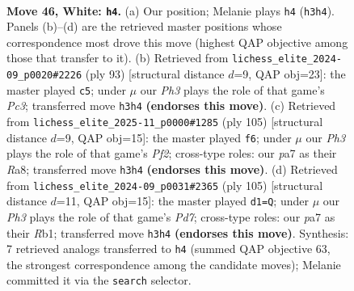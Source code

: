 \documentclass[11pt]{article}
\begin{document}
\clearpage

\begin{figure}[p]\centering
\begin{subfigure}{0.46\textwidth}\centering
\resizebox{\linewidth}{!}{%
\newchessgame
\chessboard[
  setfen={8/p2p4/2p4k/4K3/8/3r3P/5P2/8 w - - 3 46},
  showmover=false,
  pgfstyle=straightmove, color=movearrow, markmove={h3-h4}
]}
\caption{}
\end{subfigure}\hfill
\begin{subfigure}{0.46\textwidth}\centering
\resizebox{\linewidth}{!}{%
\newchessgame
\chessboard[
  setfen={8/4k3/2p4R/p4R2/8/2P5/6PP/4K3 b - - 0 47},
  showmover=false,
  pgfstyle=straightmove, color=movearrow, markmove={c6-c5}
]}
\caption{}
\end{subfigure}
\\[4pt]
\begin{subfigure}{0.46\textwidth}\centering
\resizebox{\linewidth}{!}{%
\newchessgame
\chessboard[
  setfen={r7/2R2p2/8/8/3p4/1k5P/6P1/6K1 b - - 0 53},
  showmover=false,
  pgfstyle=straightmove, color=movearrow, markmove={f7-f6}
]}
\caption{}
\end{subfigure}\hfill
\begin{subfigure}{0.46\textwidth}\centering
\resizebox{\linewidth}{!}{%
\newchessgame
\chessboard[
  setfen={8/3R4/2P5/6p1/4k3/7P/3p2K1/1r6 b - - 0 53},
  showmover=false,
  pgfstyle=straightmove, color=movearrow, markmove={d2-d1}
]}
\caption{}
\end{subfigure}
\caption{\textbf{Move 46, White: \texttt{h4}.} (a) Our position; Melanie plays \texttt{h4} (\texttt{h3h4}). Panels (b)--(d) are the retrieved master positions whose correspondence most drove this move (highest QAP objective among those that transfer to it). (b) Retrieved from \texttt{lichess\_elite\_2024-09\_p0020\#2226} (ply 93) [structural distance $d$=9, QAP obj=23]: the master played \texttt{c5}; under $\mu$ our \emph{Ph3} plays the role of that game's \emph{Pc3}; transferred move \texttt{h3h4} \textbf{(endorses this move)}. (c) Retrieved from \texttt{lichess\_elite\_2025-11\_p0000\#1285} (ply 105) [structural distance $d$=9, QAP obj=15]: the master played \texttt{f6}; under $\mu$ our \emph{Ph3} plays the role of that game's \emph{Pf2}; cross-type roles: our \emph{p}a7 as their \emph{R}a8; transferred move \texttt{h3h4} \textbf{(endorses this move)}. (d) Retrieved from \texttt{lichess\_elite\_2024-09\_p0031\#2365} (ply 105) [structural distance $d$=11, QAP obj=15]: the master played \texttt{d1=Q}; under $\mu$ our \emph{Ph3} plays the role of that game's \emph{Pd7}; cross-type roles: our \emph{p}a7 as their \emph{R}b1; transferred move \texttt{h3h4} \textbf{(endorses this move)}. Synthesis: 7 retrieved analogs transferred to \texttt{h4} (summed QAP objective 63, the strongest correspondence among the candidate moves); Melanie committed it via the \texttt{search} selector.}
\label{fig:thought-m90}
\end{figure}
\end{document}
